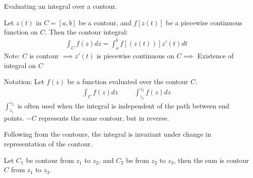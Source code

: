 \documentclass[12pt, english]{book}
\begin{document}
	Evaluating an integral over a contour. 
	
	\begin{definition}
		\label{Contour Integral Definition - Complex}
		Let \(z(t)\) in \(C = [a, b]\) be a contour, and \(f[z(t)]\) be a piecewise continuous function on \(C\). Then the contour integral:
		\begin{align*}
			\int_{C} f(z) dz = \int_{a}^{b} f[(z(t))] z'(t) dt
		\end{align*}
		Note: \(C\) is contour \(\implies z'(t)\) is piecewise continuous on \(C \implies\) Existence of integral on \(C\)
	\end{definition}
	
	Notation: 
	Let \(f(z)\) be a function evaluated over the contour \(C\).
	\begin{align*}
		\int_{C} f(z) dz &&& \int_{z_1}^{z_2} f(z) dz
	\end{align*}
	\(\int_{z_1}^{z_2}\) is often used when the integral is independent of the path between end points. \(-C\) represents the same contour, but in reverse.
	
	Following from the contours, the integral is invariant under change in representation of the contour. 
	
	\begin{definition}
		\label{Sum (Contour) Definition - Complex}
		Let \(C_1\) be contour from \(z_1\) to \(z_2\), and \(C_2\) be from \(z_2\) to \(z_3\), then the sum is contour \(C\) from \(z_1\) to \(z_3\).
	\end{definition}

	\begin{figure}[H]
		\centering
	\end{figure}
	
\end{document}
